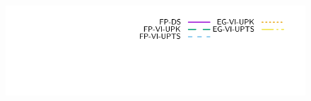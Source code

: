 \begin{frame}
\begin{figure}[htbp]
   {\includegraphics[height=\legendheight]{figure/VI/UpdateRule/1.0e-08/50/time/profile-Chain_legend.pdf}}
   \setlength{\abovecaptionskip}{-40pt}
\label{fig:VI/UpdateRule}
\end{figure}
\end{frame}


